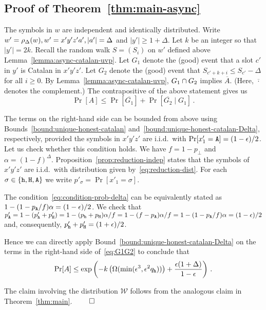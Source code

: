 \subsection{Proof of Theorem~\ref{thm:main-async}}
  The symbols in $w$ are independent and identically distributed.
  Write 
  $w' = \rho_\Delta(w), w' = x'y'z'a', |a'| = \Delta$ and $|y'| \geq 1+\Delta$. 
  Let $k$ be an integer so that $|y'| = 2k$. 
  Recall the random walk $S = (S_i)$ on $w'$ 
  defined above Lemma~\ref{lemma:async-catalan-uvp}. 
  Let $G_1$ denote the (good) event that 
  a slot $c'$ in $y'$ is Catalan in $x'y'z'$. 
  Let $G_2$ denote the (good) event that 
  $S_{c' + k + i} \leq S_{c'} - \Delta$ for all $i \geq 0$. 
  By Lemma~\ref{lemma:async-catalan-uvp}, 
  $G_1 \cap G_2$ implies $\overline{A}$. 
  (Here, $\overline{\cdot}$ denotes the complement.) 
  The contrapositive of the above statement gives us 
  \begin{equation}\label{eq:G1G2}
    \Pr[A] \leq \Pr[\overline{G_1}] + \Pr[\overline{G_2} \mid G_1]
    \,.
  \end{equation}

  The terms on the right-hand side can be bounded from above 
  using Bounds~\ref{bound:unique-honest-catalan} 
  and~\ref{bound:unique-honest-catalan-Delta}, respectively, 
  provided the symbols in $x'y'z'$ are i.i.d.\ with 
  $\Pr[x'_1 = \mathtt{A}] = (1 - \epsilon)/2$. 
  Let us check whether this condition holds. 
  We have $f = 1 - p_\perp$ and $\alpha = (1-f)^\Delta$. 
  Proposition~\ref{prop:reduction-indep} 
  states that 
  the symbols of $x'y'z'$ are i.i.d.\ 
  with distribution given by~\eqref{eq:reduction-dist}. 
  For each $\sigma \in \{\mathtt{h}, \mathtt{H}, \mathtt{A}\}$ we write 
  $p'_\sigma = \Pr[x'_1 = \sigma]$. 

  The condition~\eqref{eq:condition-prob-delta} 
  can be equivalently stated as 
  $1 - (1 - p_{\mathtt{A}}/f)\alpha = (1 - \epsilon)/2$. 
  We check that 
  $p'_{\mathtt{A}} 
  = 1 - (p'_{\mathtt{h}} + p'_{\mathtt{H}}) 
  = 1 - (p_{\mathtt{h}} + p_{\mathtt{H}})\alpha/f
  = 1 - (f - p_{\mathtt{A}})\alpha/f
  = 1 - (1 - p_{\mathtt{A}}/f)\alpha
  = (1 - \epsilon)/2
  $ 
  and, consequently, $p'_{\mathtt{h}} + p'_{\mathtt{H}} = (1 + \epsilon)/2$. 

  Hence we can directly apply 
  Bound~\ref{bound:unique-honest-catalan-Delta} 
  on the terms in the right-hand side of~\eqref{eq:G1G2} 
  to conclude that 
  \[
    \Pr[A] \leq \exp\left( 
      -k \left(\Omega(\min(\epsilon^3, \epsilon^2 q_{\mathtt{h}})) \right) 
      + 
      \frac{\epsilon(1+\Delta)}{1 - \epsilon} 
    \right)
    \,.
  \]

  The claim involving the distribution $\mathcal{W}$ 
  follows from the analogous claim in Theorem~\ref{thm:main}. 
  \hfill $\qed$  



